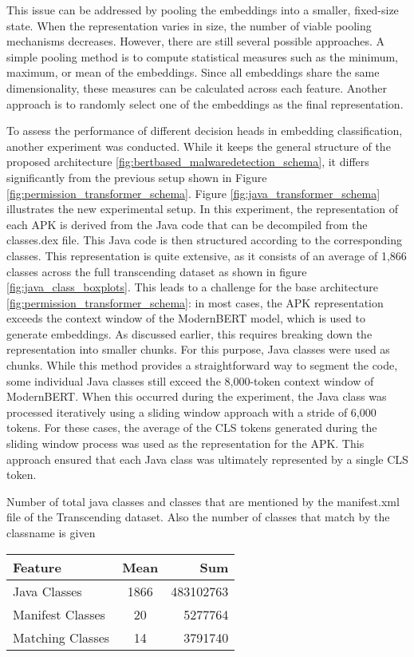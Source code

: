 This issue can be addressed by pooling the embeddings into a smaller, fixed-size state.
When the representation varies in size, the number of viable pooling mechanisms decreases. 
However, there are still several possible approaches.
A simple pooling method is to compute statistical measures such as the minimum, maximum, or mean of the embeddings.
Since all embeddings share the same dimensionality, these measures can be calculated across each feature.
Another approach is to randomly select one of the embeddings as the final representation.

To assess the performance of different decision heads in embedding classification, another experiment was conducted.
While it keeps the general structure of the proposed architecture \ref{fig:bertbased_malwaredetection_schema}, 
it differs significantly from the previous setup shown in Figure \ref{fig:permission_transformer_schema}.
Figure \ref{fig:java_transformer_schema} illustrates the new experimental setup.
In this experiment, the representation of each APK is derived from the Java code that can be decompiled from the classes.dex file.
This Java code is then structured according to the corresponding classes.
This representation is quite extensive, as it consists of an average of 1,866 classes across the full 
transcending dataset as shown in figure \ref{fig:java_class_boxplots}.
This leads to a challenge for the base architecture \ref{fig:permission_transformer_schema}: 
in most cases, the APK representation exceeds the context window of the ModernBERT model, which is used to generate embeddings.
As discussed earlier, this requires breaking down the representation into smaller chunks.
For this purpose, Java classes were used as chunks.
While this method provides a straightforward way to segment the code, 
some individual Java classes still exceed the 8,000-token context window of ModernBERT.
When this occurred during the experiment, 
the Java class was processed iteratively using a sliding window approach with a stride of 6,000 tokens.
For these cases, the average of the CLS tokens generated during the sliding window process 
was used as the representation for the APK.
This approach ensured that each Java class was ultimately represented by a single CLS token.

\begin{margintable}[-5\baselineskip]
    \caption{\label{tab:matching_java_classes_transcend} Number of total java classes and classes that are mentioned by the manifest.xml file of the Transcending dataset. Also the number of classes that match by the classname is given}
    \footnotesize
    \begin{tabular*}{\linewidth}{@{\extracolsep{\fill}} lcr@{}}
        \toprule
        \textbf{Feature} & \textbf{Mean} & \textbf{Sum} \\
        \midrule
        Java Classes & 1866 & 483102763 \\
        Manifest Classes & 20 & 5277764 \\
        Matching Classes & 14 & 3791740 \\
        \bottomrule
    \end{tabular*}
\end{margintable}

